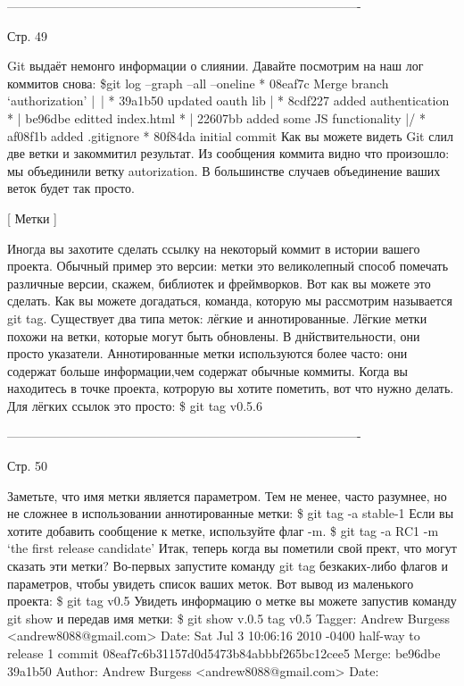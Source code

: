 -------------------------------------------------------------------------------------

Стр. 49

Git выдаёт немонго информации о слиянии. Давайте посмотрим на наш лог коммитов снова:
\$git log --graph --all --oneline
*
08eaf7c Merge branch ‘authorization’
|\
| * 39a1b50 updated oauth lib
| * 8cdf227 added authentication
* | be96dbe editted index.html
* | 22607bb added some JS functionality
|/
* af08f1b added .gitignore
* 80f84da initial commit
Как вы можете видеть Git слил две ветки и закоммитил результат. Из сообщения коммита
видно что произошло: мы объединили ветку autorization. В большинстве случаев объединение
ваших веток будет так просто.

[ Метки ]

Иногда вы захотите сделать ссылку на некоторый коммит в истории вашего проекта.
Обычный пример это версии: метки это великолепный способ помечать различные версии, скажем,
библиотек и фреймворков. Вот как вы можете это сделать.
Как вы можете догадаться, команда, которую мы рассмотрим называется git tag. Существует
два типа меток: лёгкие и аннотированные. Лёгкие метки похожи на ветки, которые могут быть
обновлены. В днйствительности, они просто указатели. Аннотированные метки используются
более часто: они содержат больше информации,чем содержат обычные коммиты.
Когда вы находитесь в точке проекта, котрорую вы хотите пометить, вот что нужно делать.
Для лёгких ссылок это просто:
\$ git tag v0.5.6

-------------------------------------------------------------------------------------

Стр. 50

Заметьте, что имя метки является параметром. Тем не менее, часто разумнее, но не 
сложнее в использовании аннотированные метки:
\$ git tag -a stable-1
Если вы хотите добавить сообщение к метке, используйте флаг -m.
\$ git tag -a RC1 -m ‘the first release candidate’
Итак, теперь когда вы пометили свой прект, что могут сказать эти метки? Во-первых
запустите команду git tag безкаких-либо флагов и параметров, чтобы увидеть список ваших
меток. Вот вывод из маленького проекта:
\$ git tag
v0.5
Увидеть информацию о метке вы можете запустив команду git show и передав имя метки:
\$ git show v.0.5
tag v0.5
Tagger: Andrew Burgess <andrew8088@gmail.com>
Date:
Sat Jul 3 10:06:16 2010 -0400
half-way to release 1
commit 08eaf7c6b31157d0d5473b84abbbf265bc12cee5
Merge: be96dbe 39a1b50
Author: Andrew Burgess <andrew8088@gmail.com>
Date:
                
